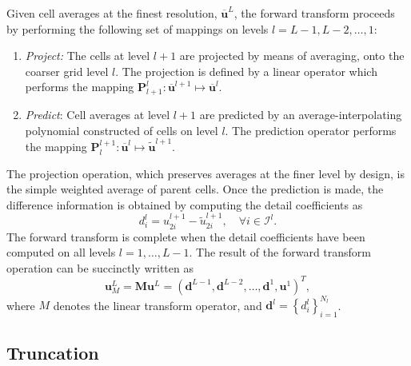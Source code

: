 \documentclass[]{article}
\begin{document}
        Given cell averages at the finest resolution, $\bm{\overline{u}}^{L}$, the forward
        transform proceeds by performing the following set of mappings on levels $l =
        L-1,L-2,\dots,1$:
        \begin{enumerate}
            \item[] \textit{Project:} The cells at level $l+1$ are projected
                by means of averaging, onto the coarser grid
                level $l$. The projection is defined by a linear operator
                which performs the mapping $\bm{P}_{l+1}^{l} : \overline{\bm{u}}^{l+1}
                \mapsto \overline{\bm{u}}^{l}$. 
            \item[] \textit{Predict}: Cell averages at level $l+1$
                are predicted by an average-interpolating polynomial constructed
                of cells on level $l$. The prediction operator performs
                the mapping $\bm{P}_{l}^{l+1} : \overline{\bm{u}}^{l} \mapsto
                \tilde{\bm{u}}^{l+1}$. 
        \end{enumerate}
        The projection operation, which preserves averages at the finer level by design, 
        is the simple weighted average of parent cells. 
              Once the prediction is made, the difference information is
        obtained by computing the detail coefficients as
        \begin{equation}
            d^{l}_{i} = u^{l+1}_{2i} - \tilde{u}^{l+1}_{2i}, \quad \forall i \in \bm{\mathcal{I}}^{l}.
        \end{equation}
        The forward transform is complete when the detail coefficients have been
        computed on all levels $l=1,\dots,L-1$. The result of the forward
        transform operation can be succinctly written as
        \begin{equation}
            \bm{u}^{L}_{M} = \bm{M} \bm{u}^{L} = \left( \bm{d}^{L-1}, \bm{d}^{L-2},
            \dots, \bm{d}^{1}, \bm{u}^{1} \right)^{T},
        \end{equation}
        where $M$ denotes the linear transform operator, and $\bm{d}^{l} =
        \left\{d^{l}_{i}\right\}_{i=1}^{N_{l}}$.

    \subsection*{Truncation}
\end{document}

